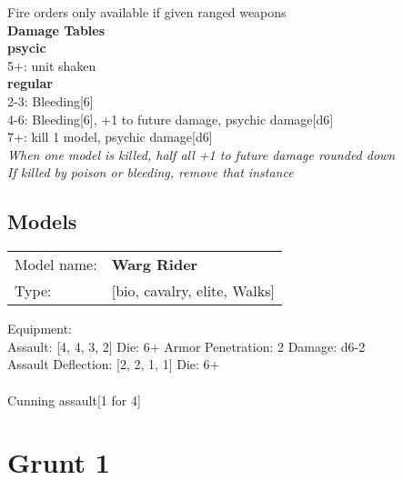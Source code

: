 Fire orders only available if given ranged weapons\\ 



{\bf Damage Tables} \\
 {\bf psycic } \\
5+: unit shaken \\
 {\bf regular } \\
2-3: Bleeding[6] \\
4-6: Bleeding[6], +1 to future damage, psychic damage[d6] \\
7+: kill 1 model, psychic damage[d6] \\
{{\it When one model is killed, half all +1 to future damage rounded down}} \\
{{\it If killed by poison or bleeding, remove that instance}} \\


\clearpage

\subsection{ Models }

\begin{tabular}{ll}
Model name: & {\bf Warg Rider } \\
Type: & [bio, cavalry, elite, Walks] \\
\end{tabular}

Equipment:  \\

Assault: [4, 4, 3, 2] Die: 6+ Armor Penetration: 2 Damage: d6-2 \\
Assault Deflection: [2, 2, 1, 1] Die: 6+\\
\\ 
Cunning assault[1 for 4]\\ 
 



 















\clearpage

\section{ Grunt 1 }

